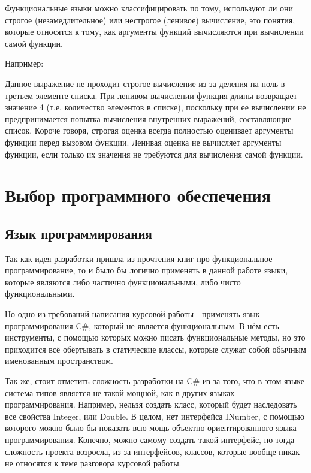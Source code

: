 Функциональные языки можно классифицировать по тому, используют ли они строгое (незамедлительное) или нестрогое (ленивое) вычисление, это понятия, которые относятся к тому, как аргументы функций вычисляются при вычислении самой функции.

Например:

\begin{code}
	
\end{code}

Данное выражение не проходит строгое вычисление из-за деления на ноль в третьем элементе списка. При ленивом вычислении функция длины возвращает значение 4 (т.е. количество элементов в списке), поскольку при ее вычислении не предпринимается попытка вычисления внутренних выражений, составляющие список. Короче говоря, строгая оценка всегда полностью оценивает аргументы функции перед вызовом функции. Ленивая оценка не вычисляет аргументы функции, если только их значения не требуются для вычисления самой функции.


\newpage
\section{Выбор программного обеспечения}

\subsection{Язык программирования}

Так как идея разработки пришла из прочтения книг про функциональное программирование, то и было бы логично применять в данной работе языки, которые являются либо частично функциональными, либо чисто функциональными.

Но одно из требований написания курсовой работы - применять язык программирования C\#, который не является функциональным. В нём есть инструменты, с помощью которых можно писать функциональные методы, но это приходится всё обёртывать в статические классы, которые служат собой обычным именованным пространством.

Так же, стоит отметить сложность разработки на C\# из-за того, что в этом языке система типов является не такой мощной, как в других языках программирования. Например, нельзя создать класс, который будет наследовать все свойства Integer, или Double. В целом, нет интерфейса INumber, с помощью которого можно было бы показать всю мощь объектно-ориентированного языка программирования. Конечно, можно самому создать такой интерфейс, но тогда сложность проекта возросла, из-за интерфейсов, классов, которые вообще никак не относятся к теме разговора курсовой работы.

